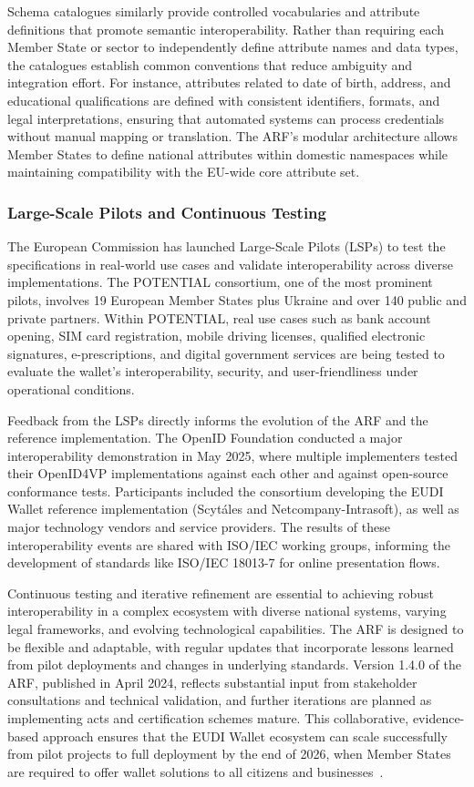 \documentclass[sigconf,balance,nonacm,authordraft]{acmart}
\begin{document}
Schema catalogues similarly provide controlled vocabularies and attribute definitions that promote semantic interoperability. Rather than requiring each Member State or sector to independently define attribute names and data types, the catalogues establish common conventions that reduce ambiguity and integration effort. For instance, attributes related to date of birth, address, and educational qualifications are defined with consistent identifiers, formats, and legal interpretations, ensuring that automated systems can process credentials without manual mapping or translation. The ARF's modular architecture allows Member States to define national attributes within domestic namespaces while maintaining compatibility with the EU-wide core attribute set.

\subsubsection{Large-Scale Pilots and Continuous Testing}

The European Commission has launched Large-Scale Pilots (LSPs) to test the specifications in real-world use cases and validate interoperability across diverse implementations. The POTENTIAL consortium, one of the most prominent pilots, involves 19 European Member States plus Ukraine and over 140 public and private partners. Within POTENTIAL, real use cases such as bank account opening, SIM card registration, mobile driving licenses, qualified electronic signatures, e-prescriptions, and digital government services are being tested to evaluate the wallet's interoperability, security, and user-friendliness under operational conditions.

Feedback from the LSPs directly informs the evolution of the ARF and the reference implementation. The OpenID Foundation conducted a major interoperability demonstration in May 2025, where multiple implementers tested their OpenID4VP implementations against each other and against open-source conformance tests. Participants included the consortium developing the EUDI Wallet reference implementation (Scytáles and Netcompany-Intrasoft), as well as major technology vendors and service providers. The results of these interoperability events are shared with ISO/IEC working groups, informing the development of standards like ISO/IEC 18013-7 for online presentation flows.

Continuous testing and iterative refinement are essential to achieving robust interoperability in a complex ecosystem with diverse national systems, varying legal frameworks, and evolving technological capabilities. The ARF is designed to be flexible and adaptable, with regular updates that incorporate lessons learned from pilot deployments and changes in underlying standards. Version 1.4.0 of the ARF, published in April 2024, reflects substantial input from stakeholder consultations and technical validation, and further iterations are planned as implementing acts and certification schemes mature. This collaborative, evidence-based approach ensures that the EUDI Wallet ecosystem can scale successfully from pilot projects to full deployment by the end of 2026, when Member States are required to offer wallet solutions to all citizens and businesses~\cite{EU_ARF2024,EU_eIDAS2024}.
\end{document}
